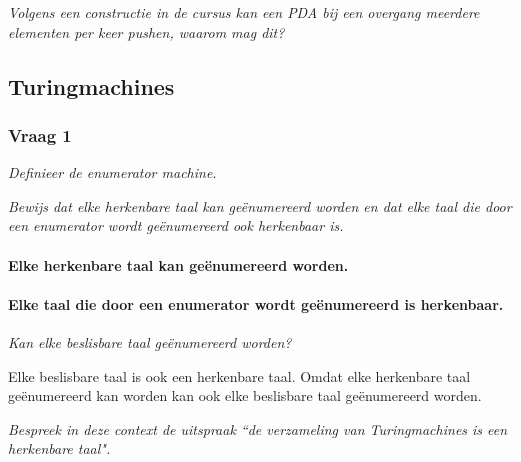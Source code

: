 \textit{Volgens een constructie in de cursus kan een PDA bij een overgang meerdere elementen per keer pushen, waarom mag dit?}


\subsection{Turingmachines}

\subsubsection{Vraag 1}

\textit{Definieer de enumerator machine.}



\textit{Bewijs dat elke herkenbare taal kan ge\"enumereerd worden en dat elke taal die door een enumerator wordt ge\"enumereerd ook herkenbaar is.}

\paragraph{Elke herkenbare taal kan ge\"enumereerd worden.}


\paragraph{Elke taal die door een enumerator wordt ge\"enumereerd is herkenbaar.}


\textit{Kan elke beslisbare taal ge\"enumereerd worden?}

Elke beslisbare taal is ook een herkenbare taal. Omdat elke herkenbare taal ge\"enumereerd kan worden kan ook elke beslisbare taal ge\"enumereerd worden.

\textit{Bespreek in deze context de uitspraak ``de verzameling van Turingmachines is een herkenbare taal".}

